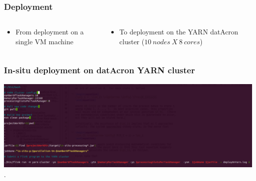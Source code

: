 \begin{frame}
\frametitle{Deployment}
\begin{columns}
\begin{column}{0.5\textwidth}
  \begin{itemize}
  \item<1-> From deployment on a single VM machine 
  \end{itemize}
\end{column}
\begin{column}{0.5\textwidth}  
  \begin{itemize}
  \item<1-> To deployment on the YARN datAcron cluster ($10\ nodes\ X\ 8\ cores$)
  \end{itemize}
\end{column}
\end{columns}
\end{frame}





\frame
{	
	\frametitle{In-situ deployment on datAcron YARN cluster}

	\begin{center}
		\includegraphics[width=.7\textwidth,height=.5\linewidth]{figures/deploy.png}
		.
	\end{center}
}


